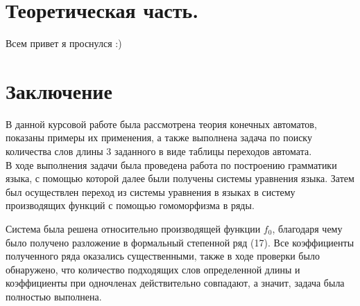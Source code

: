 \documentclass[12pt, a4paper]{article} %
\begin{document}


%




\newpage
\setcounter{page}{3}
\tableofcontents
\newpage

\section{Теоретическая часть.}

Всем привет я проснулся :)

\newpage
\section{Заключение}

В данной курсовой работе была рассмотрена теория конечных автоматов, показаны примеры их применения, а также 
выполнена задача по поиску количества слов длины 3 заданного в виде таблицы переходов автомата. \\
В ходе выполнения задачи была проведена работа по построению грамматики языка, с помощью которой
далее были получены системы уравнения языка. Затем был осуществлен переход из системы уравнения в языках
в систему производящих функций с помощью гомоморфизма в ряды.

Система была решена относительно производящей функции $f_0$, благодаря чему было получено разложение 
в формальный степенной ряд (17). Все коэффициенты полученного ряда оказались существенными, также в ходе
проверки было обнаружено, что количество подходящих слов определенной длины и коэффициенты при одночленах
действительно совпадают, а значит, задача была полностью выполнена.



\newpage
\renewcommand*\refname{Список литературы}
\nocite{*}

\newpage
\end{document}
